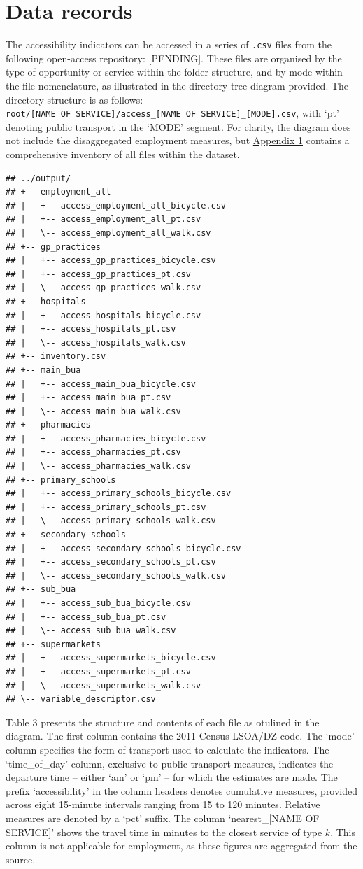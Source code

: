 \documentclass{article}
\begin{document}
\hypertarget{data-records}{%
\section{Data records}\label{data-records}}

The accessibility indicators can be accessed in a series of
\texttt{.csv} files from the following open-access repository:
{[}PENDING{]}. These files are organised by the type of opportunity or
service within the folder structure, and by mode within the file
nomenclature, as illustrated in the directory tree diagram provided. The
directory structure is as follows:
\texttt{root/{[}NAME\ OF\ SERVICE{]}/access\_{[}NAME\ OF\ SERVICE{]}\_{[}MODE{]}.csv},
with `pt' denoting public transport in the `MODE' segment. For clarity,
the diagram does not include the disaggregated employment measures, but
\protect\hyperlink{inventory}{Appendix 1} contains a comprehensive
inventory of all files within the dataset.

\begin{verbatim}
## ../output/
## +-- employment_all
## |   +-- access_employment_all_bicycle.csv
## |   +-- access_employment_all_pt.csv
## |   \-- access_employment_all_walk.csv
## +-- gp_practices
## |   +-- access_gp_practices_bicycle.csv
## |   +-- access_gp_practices_pt.csv
## |   \-- access_gp_practices_walk.csv
## +-- hospitals
## |   +-- access_hospitals_bicycle.csv
## |   +-- access_hospitals_pt.csv
## |   \-- access_hospitals_walk.csv
## +-- inventory.csv
## +-- main_bua
## |   +-- access_main_bua_bicycle.csv
## |   +-- access_main_bua_pt.csv
## |   \-- access_main_bua_walk.csv
## +-- pharmacies
## |   +-- access_pharmacies_bicycle.csv
## |   +-- access_pharmacies_pt.csv
## |   \-- access_pharmacies_walk.csv
## +-- primary_schools
## |   +-- access_primary_schools_bicycle.csv
## |   +-- access_primary_schools_pt.csv
## |   \-- access_primary_schools_walk.csv
## +-- secondary_schools
## |   +-- access_secondary_schools_bicycle.csv
## |   +-- access_secondary_schools_pt.csv
## |   \-- access_secondary_schools_walk.csv
## +-- sub_bua
## |   +-- access_sub_bua_bicycle.csv
## |   +-- access_sub_bua_pt.csv
## |   \-- access_sub_bua_walk.csv
## +-- supermarkets
## |   +-- access_supermarkets_bicycle.csv
## |   +-- access_supermarkets_pt.csv
## |   \-- access_supermarkets_walk.csv
## \-- variable_descriptor.csv
\end{verbatim}

Table 3 presents the structure and contents of each file as otulined in
the diagram. The first column contains the 2011 Census LSOA/DZ code. The
`mode' column specifies the form of transport used to calculate the
indicators. The `time\_of\_day' column, exclusive to public transport
measures, indicates the departure time -- either `am' or `pm' -- for
which the estimates are made. The prefix `accessibility' in the column
headers denotes cumulative measures, provided across eight 15-minute
intervals ranging from 15 to 120 minutes. Relative measures are denoted
by a `pct' suffix. The column `nearest\_{[}NAME OF SERVICE{]}' shows the
travel time in minutes to the closest service of type \(k\). This column
is not applicable for employment, as these figures are aggregated from
the source.
\end{document}
